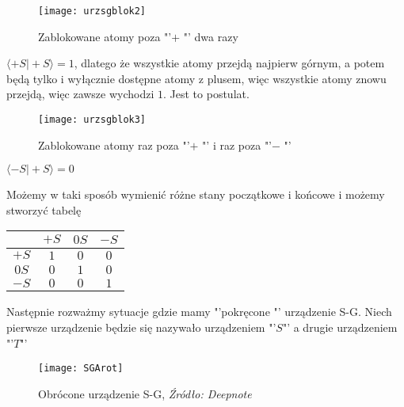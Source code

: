 \begin{minipage}{0.6 \textwidth}
	\begin{figure}[H]
		\centering
		\texttt{[image: urzsgblok2]}
		\caption{Zablokowane atomy poza  "'$+$ "' dwa razy}
		\label{fig:urzSGblok2}
	\end{figure}
\end{minipage}
\begin{minipage}{0.5 \textwidth}
	\vspace{-40pt}
	$\langle +S \vert +S \rangle = 1$, dlatego że wszystkie atomy przejdą najpierw górnym, a potem będą tylko i wyłącznie dostępne atomy z plusem, więc wszystkie atomy znowu przejdą, więc zawsze wychodzi $1$. Jest to postulat.
\end{minipage}


\begin{minipage}{0.6 \textwidth}
	\begin{figure}[H]
		\centering
		\texttt{[image: urzsgblok3]}
		\caption{Zablokowane atomy raz poza  "'$+$ "' i raz poza  "'$-$ "'}
		\label{fig:urzSGblok3}
	\end{figure}
\end{minipage}
\begin{minipage}{0.5 \textwidth}
	\vspace{-40pt}
	$\langle -S \vert +S \rangle = 0$
\end{minipage}
\newpage
Możemy w taki sposób wymienić różne stany początkowe i końcowe i możemy stworzyć tabelę
\begin{table}[ht]
	\centering
	\begin{tabular}[t]{c|c|c|c}
		& $+S$ & $0S$ & $-S$\\
		\hline
		$+S$ & $1$ & $0$ & $0$ \\
		\hline
		$0S$ & $0$ & $1$ & $0$ \\
		\hline
		$-S$ & $0$ & $0$ & $1$ \\
	\end{tabular}
	\label{tab:stany}
\end{table}

Następnie rozważmy sytuacje gdzie mamy  "'pokręcone "' urządzenie S-G. Niech pierwsze urządzenie będzie się nazywało urządzeniem "'$S$"' a drugie urządzeniem "'$T$"'

\begin{figure}[H]
	\centering
	\texttt{[image: SGArot]}
	\caption{Obrócone urządzenie S-G, \textit{Źródło: Deepnote}}
	\label{fig:SGArot}
\end{figure}

